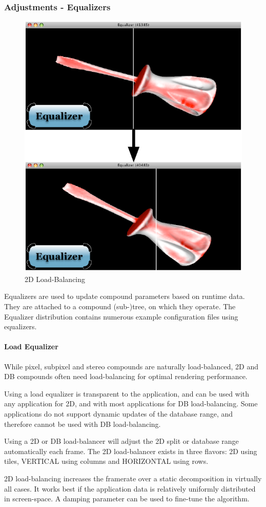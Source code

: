 \documentclass[10pt,a4]{scrartcl}
\begin{document}
\subsubsection{\label{sEqualizers}Adjustments - Equalizers}

\begin{figure}
  \includegraphics[width=.382\textwidth]{images/lb.pdf}
  {\caption{\label{fLoadBalancing}\small 2D Load-Balancing}}
\end{figure}
Equalizers are used to update compound parameters based on runtime
data. They are attached to a compound (sub-)tree, on which they
operate. The Equalizer distribution contains numerous example
configuration files using equalizers.

\paragraph{Load Equalizer}
While pixel, subpixel and stereo compounds are naturally load-balanced, 2D and
DB compounds often need load-balancing for optimal rendering performance.

Using a load equalizer is transparent to the application, and can be used with
any application for 2D, and with most applications for DB load-balancing. Some
applications do not support dynamic updates of the database range, and therefore
cannot be used with DB load-balancing.

Using a 2D or DB load-balancer will adjust the 2D split or database range
automatically each frame. The 2D load-balancer exists in three flavors:
\textsf{2D} using tiles, \textsf{VERTICAL} using columns and
\textsf{HORIZONTAL} using rows.

2D load-balancing increases the framerate over a static decomposition in
virtually all cases. It works best if the application data is relatively
uniformly distributed in screen-space. A damping parameter can be used
to fine-tune the algorithm.
\end{document}
